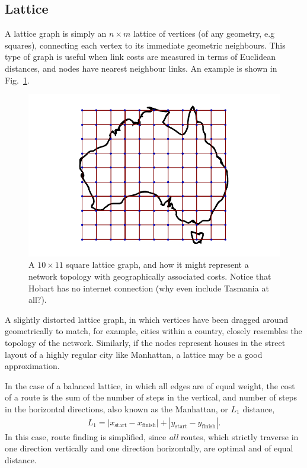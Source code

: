 \documentclass[aps,rmp,twocolumn,amsmath,amssymb,nofootinbib,superscriptaddress]{revtex4}
\begin{document}
%
%

\subsection{Lattice}

A lattice graph is simply an \mbox{$n\times m$} lattice of vertices (of any geometry, e.g squares), connecting each vertex to its immediate geometric neighbours. This type of graph is useful when link costs are measured in terms of Euclidean distances, and nodes have nearest neighbour links. An example is shown in Fig.~\ref{fig:lattice}.

\begin{figure}[!htb]
\includegraphics[width=0.7\columnwidth]{lattice}
\caption{A \mbox{$10\times 11$} square lattice graph, and how it might represent a network topology with geographically associated costs. Notice that Hobart has no internet connection (why even include Tasmania at all?).} \label{fig:lattice}
\end{figure}

A slightly distorted lattice graph, in which vertices have been dragged around geometrically to match, for example, cities within a country, closely resembles the topology of the network. Similarly, if the nodes represent houses in the street layout of a highly regular city like Manhattan, a lattice may be a good approximation.

In the case of a balanced lattice, in which all edges are of equal weight, the cost of a route is the sum of the number of steps in the vertical, and number of steps in the horizontal directions, also known as the Manhattan, or $L_1$ distance,
\begin{align}
L_1 = |x_\mathrm{start} - x_\mathrm{finish}| + |y_\mathrm{start} - y_\mathrm{finish}|.
\end{align}
In this case, route finding is simplified, since \emph{all} routes, which strictly traverse in one direction vertically and one direction horizontally, are optimal and of equal distance.
\end{document}

